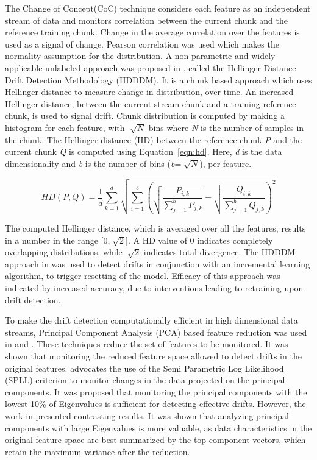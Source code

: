 \documentclass[authoryear,3p,times,twocolumn]{elsarticle}
\begin{document}
The Change of Concept(CoC) technique \citep{lee2012detection} considers each feature as an independent stream of data and monitors correlation between the current chunk and the reference training chunk. Change in the average correlation over the features is used as a signal of change. Pearson correlation was used which makes the normality assumption for the distribution. A non parametric and widely applicable unlabeled approach was proposed in \citep{ditzler2011hellinger}, called the Hellinger Distance Drift Detection Methodology (HDDDM). It is a chunk based approach which uses Hellinger distance to measure change in distribution, over time. An increased Hellinger distance, between the current stream chunk and a training reference chunk, is used to signal drift. Chunk distribution is computed by making a histogram for each feature, with $\sqrt[]{N}$ bins where \textit{N} is the number of samples in the chunk. The Hellinger distance (HD) between the reference chunk \textit{P} and the current chunk \textit{Q} is computed using Equation~\ref{eqn:hd}. Here, \textit{d} is the data dimensionality and \textit{b} is the number of bins (\textit{b}=$\sqrt[]{N}$), per feature. 

\begin{equation} \label{eqn:hd}
HD(P,Q)=  \frac { 1 }{ d } \sum _{ k=1 }^{ d }{ \sqrt { \sum _{ i=1 }^{ b }{ { \left( \sqrt { \frac { { P }_{ i,k } }{ \sum _{ j=1 }^{ b }{ { P }_{ j,k } }  }  } -\sqrt { \frac { { Q }_{ i,k } }{ \sum _{ j=1 }^{ b }{ { Q }_{ j,k } }  }  }  \right)  }^{ 2 } }  }  } 
\end{equation}

The computed Hellinger distance, which is averaged over all the features, results in a number in the range [0,$\sqrt[]{2}$]. A HD value of 0 indicates completely overlapping distributions, while $\sqrt[]{2}$ indicates total divergence. The HDDDM approach in \citep{ditzler2011hellinger} was used to detect drifts in conjunction with an incremental learning algorithm, to trigger resetting of the model. Efficacy of this approach was indicated by increased accuracy, due to interventions leading to retraining upon drift detection.  

To make the drift detection computationally efficient in high dimensional data streams, Principal Component Analysis (PCA) based feature reduction was used in \citep{kuncheva2014pca} and \citep{qahtan2015pca}. These techniques reduce the set of features to be monitored. It was shown that monitoring the reduced feature space allowed to detect drifts in the original features. \cite{kuncheva2014pca} advocates the use of the Semi Parametric Log Likelihood (SPLL) criterion to monitor changes in the data projected on the principal components. It was proposed that monitoring the principal components with the lowest 10\% of Eigenvalues is sufficient for detecting effective drifts. However, the work in \citep{qahtan2015pca} presented contrasting results. It was shown that analyzing principal components with large Eigenvalues is more valuable, as data characteristics in the original feature space are best summarized by the top component vectors, which retain the maximum variance after the reduction. 
\end{document}
